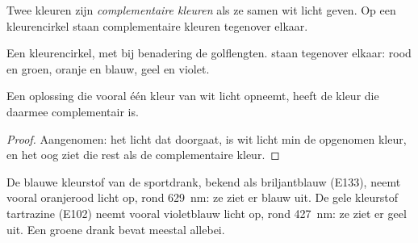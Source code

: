 \begin{definition}\label{def:g11:absorbance:complementary}
Twee kleuren zijn \emph{complementaire kleuren}
als ze samen wit licht geven. Op een kleurencirkel staan complementaire
kleuren tegenover elkaar.
\end{definition}

\begin{omfigure}

{\small Een kleurencirkel, met bij benadering de golflengten.
 staan tegenover elkaar: rood en groen, oranje en
blauw, geel en violet.}
\end{omfigure}

\begin{proposition}\label{prop:g11:absorbance:colour-seen}
Een oplossing die vooral één kleur van wit licht opneemt, heeft de kleur
die daarmee complementair is.
\end{proposition}

\begin{proof}
Aangenomen: het licht dat doorgaat, is wit licht min de opgenomen kleur,
en het oog ziet die rest als de complementaire kleur.
\end{proof}

\begin{example}\label{ex:g11:absorbance:dyes}
De blauwe kleurstof van de sportdrank, bekend als briljantblauw (E133),
neemt vooral oranjerood licht op, rond \qty{629}{nm}: ze ziet er blauw
uit. De gele kleurstof tartrazine (E102) neemt vooral violetblauw licht
op, rond \qty{427}{nm}: ze ziet er geel uit. Een groene drank bevat meestal
allebei.
\end{example}

